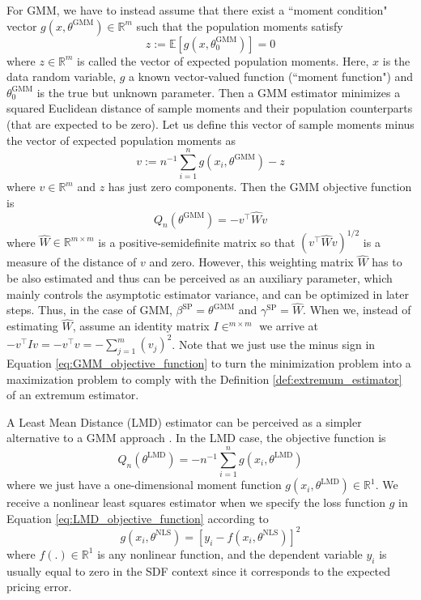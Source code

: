For GMM, we have to instead assume that there exist a ``moment condition" vector $g(x, \theta^{\mathrm{GMM}}) \in \mathbb{R}^m$ such that the population moments satisfy
\[
z := \mathbb{E} \left[ g(x, \theta_0^{\mathrm{GMM}}) \right]=0
\]
where $z \in \mathbb{R}^m$ is called the vector of expected population moments.
Here, $x$ is the data random variable, $g$ a known vector-valued function (``moment function") and $\theta_0^{\mathrm{GMM}}$ is the true but unknown parameter.
Then a GMM estimator minimizes a squared Euclidean distance of sample moments and their population counterparts (that are expected to be zero). 
Let us define this vector of sample moments minus the vector of expected population moments as
\[
v := n^{-1} \sum_{i=1}^n g(x_i, \theta^{\mathrm{GMM}}) - z
\]
where  $v \in \mathbb{R}^m$ and $z$ has just zero components.
Then the GMM objective function is
\begin{equation}
	\label{eq:GMM_objective_function}
	Q_n(\theta^{\mathrm{GMM}}) = - v^{\top} \hat{W} v
\end{equation}
where $\hat{W} \in \mathbb{R}^{m \times m}$ is a positive-semidefinite matrix so that $(v^{\top} \hat{W} v)^{1/2}$ is a measure of the distance of $v$ and zero.
However, this weighting matrix $\hat{W}$ has to be also estimated and thus can be perceived as an auxiliary parameter, which mainly controls the asymptotic estimator variance, and can be optimized in later steps.
Thus, in the case of GMM, $\beta^{\mathrm{SP}}=\theta^{\mathrm{GMM}}$ and $\gamma^{\mathrm{SP}} = \hat{W}$.
When we, instead of estimating $\hat{W}$, assume an identity matrix $I \in ^{m \times m}$ we arrive at $-v^{\top} I v = - v^{\top} v = - \sum_{j=1}^m (v_j)^2$.
Note that we just use the minus sign in Equation \ref{eq:GMM_objective_function} to turn the minimization problem into a maximization problem to comply with the Definition \ref{def:extremum_estimator} of an extremum estimator.

A Least Mean Distance (LMD) estimator can be perceived as a simpler alternative to a GMM approach \cite[Equation 7.1]{PP97}.
In the LMD case, the objective function is
\begin{equation}
	\label{eq:LMD_objective_function}
	Q_n(\theta^{\mathrm{LMD}}) = - n^{-1} \sum_{i=1}^n g(x_i, \theta^{\mathrm{LMD}})
\end{equation}
where we just have a one-dimensional moment function $g(x_i, \theta^{\mathrm{LMD}}) \in \mathbb{R}^1$.
We receive a nonlinear least squares estimator when we specify the loss function $g$ in Equation \ref{eq:LMD_objective_function} according to
\begin{equation}
	\label{eq:NLS_moment_function}
	g(x_i, \theta^{\mathrm{NLS}}) = \left[ y_i - f(x_i, \theta^{\mathrm{NLS}}) \right]^2
\end{equation}
where $f(.) \in \mathbb{R}^1$ is any nonlinear function, and the dependent variable $y_i$ is usually equal to zero in the SDF context since it corresponds to the expected pricing error.


